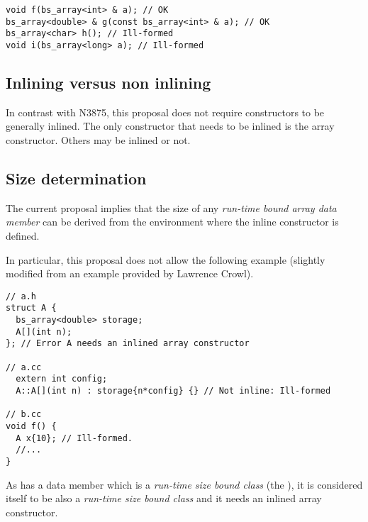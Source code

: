 \begin{lstlisting}
void f(bs_array<int> & a); // OK
bs_array<double> & g(const bs_array<int> & a); // OK
bs_array<char> h(); // Ill-formed
void i(bs_array<long> a); // Ill-formed
\end{lstlisting}

\subsection{Inlining versus non inlining}

In contrast with N3875, this proposal does not require constructors to be
generally inlined. The only constructor that needs to be inlined is the
array constructor. Others may be inlined or not.

\subsection{Size determination}
\label{sec:inline-size-det}

The current proposal implies that the size of any \emph{run-time bound array
data member} can be derived from the environment where the inline constructor is
defined.

In particular, this proposal does not allow the following example (slightly
modified from an example provided by Lawrence Crowl).

\begin{lstlisting}
// a.h
struct A {
  bs_array<double> storage;
  A[](int n);
}; // Error A needs an inlined array constructor

// a.cc
  extern int config;
  A::A[](int n) : storage{n*config} {} // Not inline: Ill-formed

// b.cc
void f() {
  A x{10}; // Ill-formed.
  //...
}
\end{lstlisting}

As   has a data member which is a \emph{run-time size bound class}
(the ), it is considered itself to be also a \emph{run-time size
bound class} and it needs an inlined array constructor.

